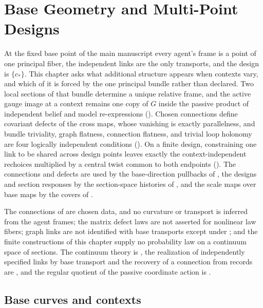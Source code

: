 \chapter{Base Geometry and Multi-Point Designs}
\label{ch:base-geometry}

At the fixed base point of the main manuscript every agent's frame is a point of one principal
fiber, the independent links are the only transports, and the design is \(\{c_*\}\). This chapter
asks what additional structure appears when contexts vary, and which of it is forced by the one
principal bundle rather than declared. Two local sections of that bundle determine a unique
relative frame, and the active gauge image at a context remains one copy of \(G\) inside the passive
product of independent belief and model re-expressions
(). Chosen connections define
covariant defects of the cross maps, whose vanishing is exactly parallelness, and bundle
triviality, graph flatness, connection flatness, and trivial loop holonomy are four logically
independent conditions (). On a
finite design, constraining one link to be shared across design points leaves exactly the
context-independent rechoices multiplied by a central twist common to both endpoints
(). The connections and defects are used by the base-direction
pullbacks of , the designs and section responses by the section-space
histories of , and the scale maps over base maps by the covers of
.

The connections of  are chosen data, and no curvature or transport is
inferred from the agent frames; the matrix defect laws are not asserted for nonlinear law fibers;
graph links are not identified with base transports except under
; and the finite constructions of this chapter supply no
probability law on a continuum space of sections.  The continuum theory is
, the realization of independently specified links by base
transport and the recovery of a connection from records are
, and the regular quotient of the passive
coordinate action is .

\section{Base curves and contexts}
\label{sec:geo-base-curves}

